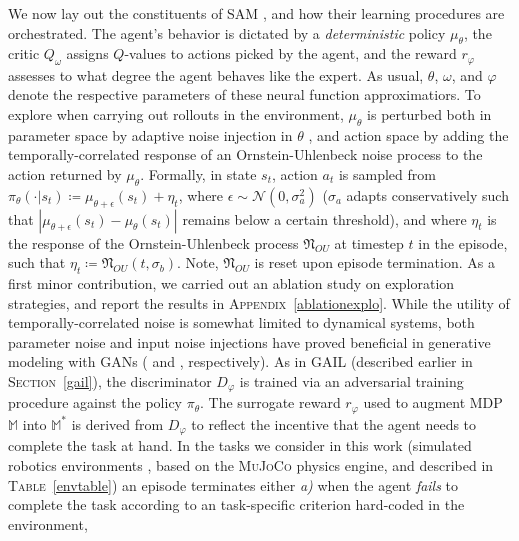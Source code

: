 We now lay out the constituents of SAM \cite{Blonde2019-vc}, and how their learning
procedures are orchestrated.
The agent's behavior is dictated by a \emph{deterministic} policy $\mu_\theta$,
the critic $Q_\omega$ assigns $Q$-values to actions picked by the agent,
and the reward $r_\varphi$ assesses to what degree the agent behaves like the expert.
As usual, $\theta$, $\omega$, and $\varphi$ denote the respective parameters of
these neural function approximatiors.
To explore when carrying out rollouts in the environment, $\mu_\theta$ is perturbed
both in parameter space by adaptive noise injection in $\theta$
\cite{Plappert2018-rl, Fortunato2017-af},
and action space by adding the temporally-correlated response
of an Ornstein-Uhlenbeck noise process \cite{Uhlenbeck1930-an,Lillicrap2016-xa}
to the action returned by $\mu_\theta$.
Formally, in state $s_t$, action $a_t$ is sampled from
$\pi_\theta(\cdot | s_t) \coloneqq \mu_{\theta + \epsilon}(s_t) + \eta_t$,
where $\epsilon \sim \mathcal{N}(0, \sigma_a^2)$ ($\sigma_a$ adapts conservatively such that
$|\mu_{\theta + \epsilon}(s_t) - \mu_\theta(s_t)|$ remains below a certain threshold),
and where $\eta_t$ is the response of the Ornstein-Uhlenbeck process \cite{Uhlenbeck1930-an}
$\mathfrak{N}_{OU}$ at timestep $t$ in the episode,
such that $\eta_t \coloneqq \mathfrak{N}_{OU}(t, \sigma_b)$.
Note, $\mathfrak{N}_{OU}$ is reset upon episode termination.
As a first minor contribution, we carried out an ablation study
on exploration strategies, and report the results in
\textsc{Appendix}~\ref{ablationexplo}.
While the utility of temporally-correlated noise is somewhat limited to dynamical systems,
both parameter noise and input noise injections
have proved beneficial in generative modeling with GANs
(\cite{Zhao2017-bs} and \cite{Arjovsky2017-ne}, respectively).
As in GAIL \cite{Ho2016-bv} (described earlier in \textsc{Section}~\ref{gail}),
the discriminator $D_\varphi$ is trained via an adversarial
training procedure \cite{Goodfellow2014-yk} against the policy $\pi_\theta$.
The surrogate reward $r_\varphi$ used to augment MDP $\mathbb{M}$ into $\mathbb{M}^*$
is derived from $D_\varphi$ to reflect the incentive that the agent needs to complete
the task at hand.
In the tasks we consider in this work
(simulated robotics environments \cite{Brockman2016-un},
based on the \textsc{MuJoCo} \cite{Todorov2012-gc} physics engine,
and described in \textsc{Table}~\ref{envtable})
an episode terminates either
\textit{a)} when the agent \textit{fails} to complete
the task according to an task-specific criterion hard-coded in the environment,
